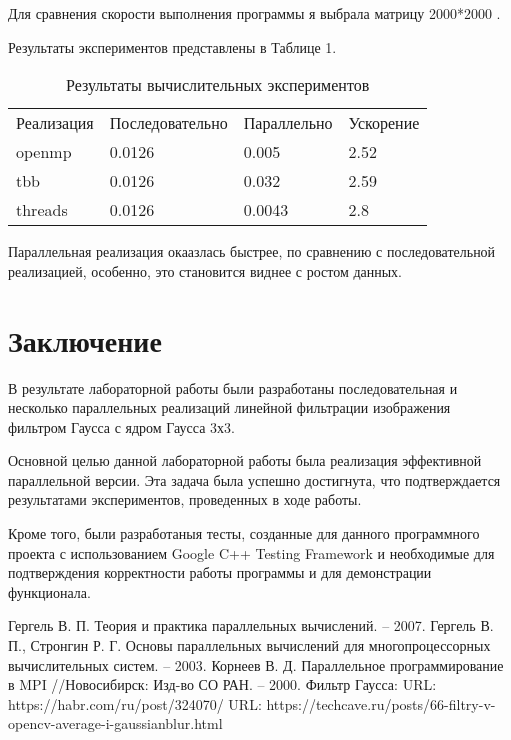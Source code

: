 \documentclass{report}
\begin{document}
\par Для сравнения скорости выполнения программы я выбрала матрицу 2000*2000 . 
\par Результаты экспериментов представлены в Таблице 1.

\begin{table}[!h]
\caption{Результаты вычислительных экспериментов}
\centering
\begin{tabular}{p{4cm} p{4cm} p{4cm} p{4cm}}
Реализация & Последовательно & Параллельно & Ускорение  \\
openmp        & 0.0126          & 0.005     & 2.52       \\
tbb        & 0.0126         & 0.032     & 2.59       \\
threads        & 0.0126         & 0.0043     & 2.8         
\end{tabular}
\end{table}

\par Параллельная реализация окаазлась быстрее, по сравнению с последовательной реализацией, особенно, это становится виднее с ростом данных. 
\newpage

\section*{Заключение}
В результате лабораторной работы были разработаны последовательная и несколько параллельных реализаций линейной фильтрации изображения фильтром Гаусса с ядром Гаусса 3х3.
\par Основной целью данной лабораторной работы была реализация эффективной параллельной версии. Эта задача была успешно достигнута, что подтверждается результатами экспериментов, проведенных в ходе работы.
\par Кроме того, были разработаныя тесты, созданные для данного программного проекта с использованием Google C++ Testing Framework и необходимые для подтверждения корректности работы программы и для демонстрации функционала.
\newpage

\begin{thebibliography}{1}
Гергель В. П. Теория и практика параллельных вычислений. – 2007. 
Гергель В. П., Стронгин Р. Г. Основы параллельных вычислений для многопроцессорных вычислительных систем. – 2003.
Корнеев В. Д. Параллельное программирование в MPI //Новосибирск: Изд-во СО РАН. – 2000.
Фильтр Гаусса: URL: https://habr.com/ru/post/324070/
URL: https://techcave.ru/posts/66-filtry-v-opencv-average-i-gaussianblur.html
\end{thebibliography}
\newpage
\end{document}
